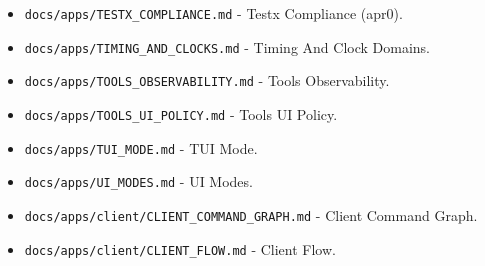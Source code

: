 \documentclass[9pt,a4paper,openany]{book}
\begin{document}
\begin{itemize}
\item \texttt{docs/\allowbreak{}apps/\allowbreak{}TESTX\_\allowbreak{}COMPLIANCE.\allowbreak{}md} -\allowbreak{} Testx Compliance (apr0).\allowbreak{}
\end{itemize}

\begin{itemize}
\item \texttt{docs/\allowbreak{}apps/\allowbreak{}TIMING\_\allowbreak{}AND\_\allowbreak{}CLOCKS.\allowbreak{}md} -\allowbreak{} Timing And Clock Domains.\allowbreak{}
\end{itemize}

\begin{itemize}
\item \texttt{docs/\allowbreak{}apps/\allowbreak{}TOOLS\_\allowbreak{}OBSERVABILITY.\allowbreak{}md} -\allowbreak{} Tools Observability.\allowbreak{}
\end{itemize}

\begin{itemize}
\item \texttt{docs/\allowbreak{}apps/\allowbreak{}TOOLS\_\allowbreak{}UI\_\allowbreak{}POLICY.\allowbreak{}md} -\allowbreak{} Tools UI Policy.\allowbreak{}
\end{itemize}

\begin{itemize}
\item \texttt{docs/\allowbreak{}apps/\allowbreak{}TUI\_\allowbreak{}MODE.\allowbreak{}md} -\allowbreak{} TUI Mode.\allowbreak{}
\end{itemize}

\begin{itemize}
\item \texttt{docs/\allowbreak{}apps/\allowbreak{}UI\_\allowbreak{}MODES.\allowbreak{}md} -\allowbreak{} UI Modes.\allowbreak{}
\end{itemize}

\begin{itemize}
\item \texttt{docs/\allowbreak{}apps/\allowbreak{}client/\allowbreak{}CLIENT\_\allowbreak{}COMMAND\_\allowbreak{}GRAPH.\allowbreak{}md} -\allowbreak{} Client Command Graph.\allowbreak{}
\end{itemize}

\begin{itemize}
\item \texttt{docs/\allowbreak{}apps/\allowbreak{}client/\allowbreak{}CLIENT\_\allowbreak{}FLOW.\allowbreak{}md} -\allowbreak{} Client Flow.\allowbreak{}
\end{itemize}
\end{document}
